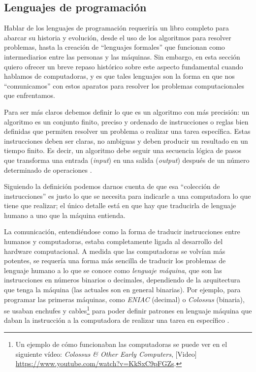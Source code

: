 \documentclass[letterpaper,12pt,oneside]{book}
\begin{document}
		
		\clearpage
		\subsection{Lenguajes de programación}
		
		Hablar de los lenguajes de programación requeriría un libro completo para abarcar su historia y evolución, desde el uso de los algoritmos
		para resolver problemas, hasta la creación de ``lenguajes formales'' que funcionan como intermediarios entre las personas y las máquinas. Sin embargo,
		en esta sección quiero ofrecer un breve repaso histórico sobre este aspecto fundamental cuando hablamos de computadoras, y es que tales lenguajes
		son la forma en que nos ``comunicamos'' con estos aparatos para resolver los problemas computacionales que enfrentamos.
		
		Para ser más claros debemos definir lo que es un algoritmo con más precisión: un algoritmo es un conjunto finito, preciso y ordenado de instrucciones 
		o reglas bien definidas que permiten resolver un problema o realizar una tarea específica. Estas instrucciones deben ser claras, no ambiguas y deben 
		producir un resultado en un tiempo finito. Es decir, un algoritmo debe seguir una secuencia lógica de pasos que transforma una entrada 
		(\textit{input}) en una 
		salida (\textit{output}) después de un número determinado de operaciones \cite{sipser_introduction_2013}.
		
		Siguiendo la definición
		podemos darnos cuenta de que esa ``colección de instrucciones'' 
		es justo lo que se necesita para indicarle a una computadora lo que tiene que realizar; el único
		detalle está en que hay que traducirla de lenguaje humano a uno que la máquina entienda.
		
		La comunicación, entendiéndose como la forma de traducir instrucciones entre humanos y computadoras, estaba		
		completamente ligada al desarrollo del hardware computacional. A medida que las computadoras se volvían más potentes, se requería
		una forma más sencilla de traducir los problemas de lenguaje humano a lo que se conoce como \textit{lenguaje máquina}, que son las instrucciones en números
		binarios o decimales, dependiendo de la arquitectura que tenga la máquina (las actuales son en general binarias). Por ejemplo, para programar las primeras máquinas, como \textit{ENIAC} (decimal) o \textit{Colossus} (binaria), se usaban enchufes y cables\footnote{Un ejemplo de cómo funcionaban las computadoras se puede ver en el siguiente vídeo: \emph{ 
		Colossus \& Other Early Computers}, [Video] \url{https://www.youtube.com/watch?v=KkSxC9pFGZs}. } para poder definir patrones en lenguaje máquina que daban la instrucción a la computadora de 	
		realizar una tarea en específico \cite[p. 8]{tanenbaum_modern_2002}. 
		
\end{document}
